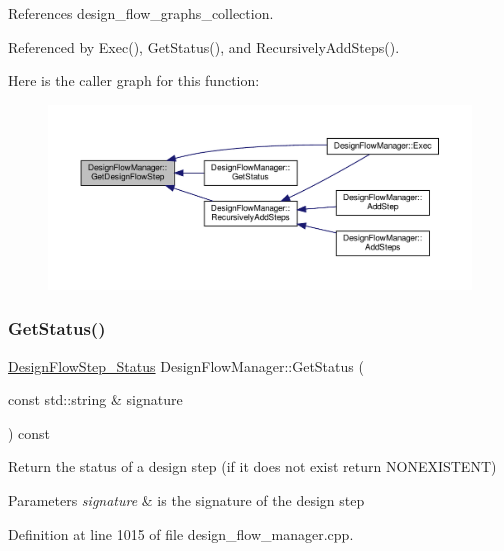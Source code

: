 References design\+\_\+flow\+\_\+graphs\+\_\+collection.



Referenced by Exec(), Get\+Status(), and Recursively\+Add\+Steps().

Here is the caller graph for this function\+:
\nopagebreak
\begin{figure}[H]
\begin{center}
\leavevmode
\includegraphics[width=350pt]{de/d63/classDesignFlowManager_aac97bf59eaa0aaad7c5b4e2b31d7fb55_icgraph}
\end{center}
\end{figure}
\mbox{\label{classDesignFlowManager_af692644b14a5f889d8511f41aa1317b4}} 
\subsubsection{\texorpdfstring{Get\+Status()}{GetStatus()}}
{\footnotesize\ttfamily \hyperlink{design__flow__step_8hpp_afb1f0d73069c26076b8d31dbc8ebecdf}{Design\+Flow\+Step\+\_\+\+Status} Design\+Flow\+Manager\+::\+Get\+Status (\begin{DoxyParamCaption}\item[{const std\+::string \&}]{signature }\end{DoxyParamCaption}) const}



Return the status of a design step (if it does not exist return N\+O\+N\+E\+X\+I\+S\+T\+E\+NT) 


\begin{DoxyParams}{Parameters}
{\em signature} & is the signature of the design step \\
\hline
\end{DoxyParams}


Definition at line 1015 of file design\+\_\+flow\+\_\+manager.\+cpp.



